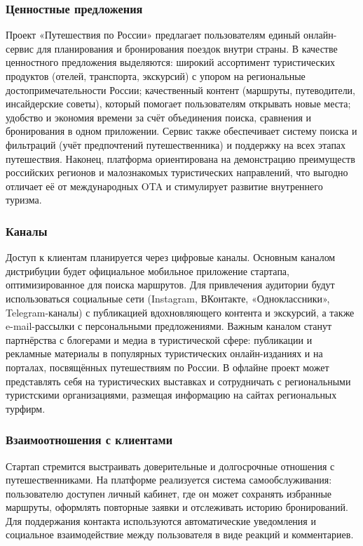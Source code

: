 \subsubsection*{Ценностные предложения}
Проект «Путешествия по России» предлагает пользователям единый онлайн-сервис для планирования и бронирования поездок внутри страны. В качестве ценностного предложения выделяются: широкий ассортимент туристических продуктов (отелей, транспорта, экскурсий) с упором на региональные достопримечательности России; качественный контент (маршруты, путеводители, инсайдерские советы), который помогает пользователям открывать новые места; удобство и экономия времени за счёт объединения поиска, сравнения и бронирования в одном приложении. Сервис также обеспечивает систему поиска и фильтраций (учёт предпочтений путешественника) и поддержку на всех этапах путешествия. Наконец, платформа ориентирована на демонстрацию преимуществ российских регионов и малознакомых туристических направлений, что выгодно отличает её от международных OTA и стимулирует развитие внутреннего туризма.

\subsubsection*{Каналы}
Доступ к клиентам планируется через цифровые каналы. Основным каналом дистрибуции будет официальное мобильное приложение стартапа, оптимизированное для поиска маршрутов. Для привлечения аудитории будут использоваться социальные сети (Instagram, ВКонтакте, «Одноклассники», Telegram-каналы) с публикацией вдохновляющего контента и экскурсий, а также e-mail-рассылки с персональными предложениями. Важным каналом станут партнёрства с блогерами и медиа в туристической сфере: публикации и рекламные материалы в популярных туристических онлайн-изданиях и на порталах, посвящённых путешествиям по России. В офлайне проект может представлять себя на туристических выставках и сотрудничать с региональными туристскими организациями, размещая информацию на сайтах региональных турфирм.

\subsubsection*{Взаимоотношения с клиентами}
Стартап стремится выстраивать доверительные и долгосрочные отношения с путешественниками. На платформе реализуется система самообслуживания: пользователю доступен личный кабинет, где он может сохранять избранные маршруты, оформлять повторные заявки и отслеживать историю бронирований. Для поддержания контакта используются автоматические уведомления и социальное взаимодействие между пользователя в виде реакций и комментариев. 

